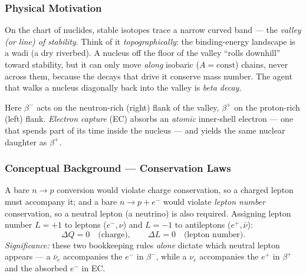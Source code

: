 \subsubsection*{Physical Motivation}
On the chart of nuclides, stable isotopes trace a narrow curved band --- the
\emph{valley (or line) of stability}. Think of it \emph{topographically}: the
binding-energy landscape is a wadi (a dry riverbed). A nucleus off the floor of
the valley ``rolls downhill'' toward stability, but it can only move \emph{along}
isobaric ($A=\text{const}$) chains, never across them, because the decays that
drive it conserve mass number. The agent that walks a nucleus diagonally back
into the valley is \emph{beta decay}.

Here $\beta^-$ acts on the neutron-rich (right) flank of the valley, $\beta^+$ on
the proton-rich (left) flank. \emph{Electron capture} (EC) absorbs an
\emph{atomic} inner-shell electron --- one that spends part of its time inside
the nucleus --- and yields the same nuclear daughter as $\beta^+$.

\subsubsection*{Conceptual Background --- Conservation Laws}
A bare $n\to p$ conversion would violate charge conservation, so a charged lepton
must accompany it; and a bare $n\to p+e^-$ would violate \emph{lepton number}
conservation, so a neutral lepton (a neutrino) is also required. Assigning
lepton number $L=+1$ to leptons ($e^-,\nu$) and $L=-1$ to antileptons
($e^+,\bar\nu$):
\begin{equation}
  \label{eq:lec09:conservation}
  \boxed{\Delta Q = 0 \quad\text{(charge)}, \qquad \Delta L = 0 \quad\text{(lepton number)}.}
\end{equation}
\textit{Significance:} these two bookkeeping rules \emph{alone} dictate which
neutral lepton appears --- a $\bar\nu_e$ accompanies the $e^-$ in $\beta^-$, while
a $\nu_e$ accompanies the $e^+$ in $\beta^+$ and the absorbed $e^-$ in EC.

